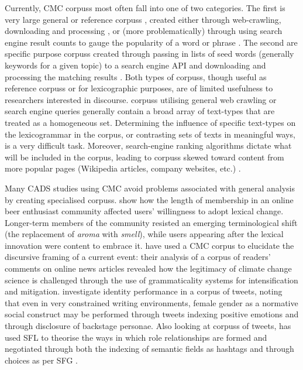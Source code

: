 Currently, \gls{CMC} \glspl{corpus} most often fall into one of two categories. The first is very large general or reference \glspl{corpus} \cite[e.g.][]{minocha_feed_2013,fletcher_corpus_2012,baroni_wacky_2009,kilgarriff_estenten_2013}, created either through web\hyp{}crawling, downloading and processing \cite[see][]{baroni_wacky_2009}, or (more problematically) through using search engine result counts to gauge the popularity of a word or phrase \cite[see][]{kilgarriff_googleology_2007}. The second are specific purpose \glspl{corpus} created through passing in lists of seed words (generally keywords for a given topic) to a search engine \gls{API} and downloading and processing the matching results \cite[see][]{baroni_webbootcat:_2006}. Both types of \glspl{corpus}, though useful as reference \glspl{corpus} or for lexicographic purposes, are of limited usefulness to researchers interested in discourse. \Glspl{corpus} utilising general web crawling or search engine queries generally contain a broad array of text\hyp{}types that are treated as a homogeneous set. Determining the influence of specific text\hyp{}types on the lexicogrammar in the \gls{corpus}, or contrasting sets of texts in meaningful ways, is a very difficult task. Moreover, search\hyp{}engine ranking algorithms dictate what will be included in the corpus, leading to \glspl{corpus} skewed toward content from more popular pages (Wikipedia articles, company websites, etc.) \cite{kilgarriff_webbootcat_2013}.

Many \gls{CADS} studies using \gls{CMC} avoid problems associated with general analysis by creating specialised \glspl{corpus}. \textcite{danescu-niculescu-mizil_no_2013} show how the length of membership in an online beer enthusiast community affected users' willingness to adopt lexical change. Longer-term members of the community resisted an emerging terminological shift (the replacement of \emph{aroma} with \emph{smell}), while users appearing after the lexical innovation were content to embrace it.%
\textcite{koteyko_climate_2013} have used a \gls{CMC} \gls{corpus} to elucidate the discursive framing of a current event: their analysis of a \gls{corpus} of readers' comments on online news articles revealed how the legitimacy of climate change science is challenged through the use of grammaticality systems for intensification and mitigation. \textcite{courtney_walton_mediated_2013} investigate identity performance in a \gls{corpus} of tweets, noting that even in very constrained writing environments, female gender as a normative social construct may be performed through tweets indexing positive emotions and through disclosure of backstage personae. Also looking at \glspl{corpus} of tweets, \textcite{zappavigna_ambient_2011,zappavigna_discourse_2012,zappavigna_enacting_2013} has used \gls{SFL} to theorise the ways in which role relationships are formed and negotiated through both the indexing of semantic fields as hashtags and through  choices as per \gls{SFG} \cite[see][\slash Section \ref{sect:sfl}]{halliday_introduction_2004}.

